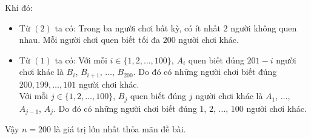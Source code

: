 \begin{ex}
{\begin{itemize}
\end{itemize}
Khi đó:
\begin{itemize}
\item Từ $(2)$ ta có: Trong ba người chơi bất kỳ, có ít nhất $2$ người không quen nhau. Mỗi người chơi quen biết tối đa $200$ người chơi khác.
\item Từ $(1)$ ta có: Với mỗi $i\in\{1, 2, \ldots, 100\}$, $A_i$ quen biết đúng $201-i$ người chơi khác là $B_i$, $B_{i+1}$, $\ldots$, $B_{200}$. Do đó có những người chơi biết đúng $200, 199, \ldots, 101$ người chơi khác.\\
    Với mỗi $j\in\{1, 2, \ldots, 100\}$, $B_j$ quen biết đúng $j$ người chơi khác là $A_1$, $\ldots$, $A_{j-1}$, $A_j$. Do đó có những người chơi biết đúng $1$, $2$, $\ldots$, $100$ người chơi khác.
\end{itemize}
Vậy $n=200$ là giá trị lớn nhất thỏa mãn đề bài.
	}
\end{ex}

